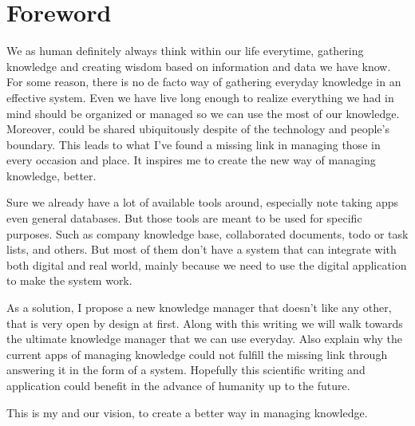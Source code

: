 \begingroup
\let\clearpage\relax
\let\cleardoublepage\relax

\chapter{Foreword}
\label{chap:foreword}

We as human definitely always think within our life everytime, gathering knowledge and creating wisdom based on information and data we have know.
For some reason, there is no de facto way of gathering everyday knowledge in an effective system.
Even we have live long enough to realize everything we had in mind should be organized or managed so we can use the most of our knowledge.
Moreover, could be shared ubiquitously despite of the technology and people's boundary.
This leads to what I've found a missing link in managing those in every occasion and place.
It inspires me to create the new way of managing knowledge, better.

Sure we already have a lot of available tools around, especially note taking apps even general databases.
But those tools are meant to be used for specific purposes.
Such as company knowledge base, collaborated documents, todo or task lists, and others.
But most of them don't have a system that can integrate with both digital and real world, mainly because we need to use the digital application to make the system work.

As a solution, I propose a new knowledge manager that doesn't like any other, that is very open by design at first.
Along with this writing we will walk towards the ultimate knowledge manager that we can use everyday.
Also explain why the current apps of managing knowledge could not fulfill the missing link through answering it in the form of a system.
Hopefully this scientific writing and application could benefit in the advance of humanity up to the future.

This is my and our vision, to create a better way in managing knowledge.

\endgroup
